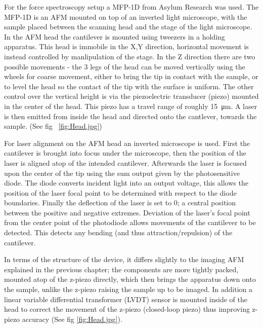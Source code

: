 For the force spectroscopy setup a MFP-1D from Asylum Research was used. The MFP-1D is an AFM mounted on top of an inverted light microscope, with the sample placed between the scanning head and the stage of the light microscope. In the AFM head the cantilever is mounted using tweezers in a holding apparatus. This head is immobile in the X,Y direction, horizontal movement is instead controlled by manlipulation of the stage. In the Z direction there are two possible movements - the 3 legs of the head can be moved vertically using the wheels for coarse movement, either to bring the tip in contact with the sample, or to level the head so the contact of the tip with the surface is uniform. The other control over the vertical height is via the piezoelectric transducer (piezo) mounted in the center of the head. This piezo has a travel range of roughly \SI{15}{\micro\metre}. A laser is then emitted from inside the head and directed onto the cantlever, towards the sample. (See fig ~\ref{fig:Head.jpg})

For laser alignment on the AFM head an inverted microscope is used. First the cantilever is brought into focus under the microscope, then the position of the laser is aligned atop of the intended cantilever. Afterwards the laser is focused upon the center of the tip using the sum output given by the photosensitive diode. The diode converts incident light into an output voltage, this allows the position of the laser focal point to be determined with respect to the diode boundaries.  Finally the deflection of the laser is set to 0; a central position between the positive and negative extremes. Deviation of the laser's focal point from the center point of the photodiode allows movements of the cantilever to be detected. This detects any bending (and thus attraction/repulsion) of the cantilever. 

In terms of the structure of the device, it differs slightly to the imaging AFM explained in the previous chapter; the components are more tightly packed, mounted atop of the z-piezo directly, which then brings the apparatus down onto the sample, unlike the z-piezo raising the sample up to be imaged. In addition a linear variable differential transformer (LVDT) sensor is mounted inside of the head to correct the movement of the z-piezo (closed-loop piezo) thus improving z-piezo accuracy (See fig \ref{fig:Head.jpg}).

